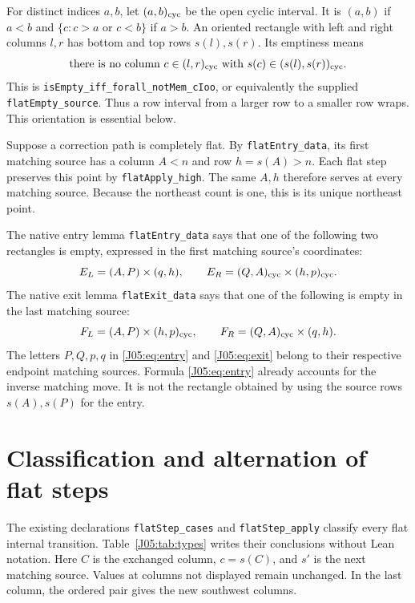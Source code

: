 \documentclass[11pt,oneside]{report}
\theoremstyle{definition}
\numberwithin{equation}{section}
\newcommand{\decl}[1]{\textnormal{\nolinkurl{#1}}}
\begin{document}
For distinct indices $a,b$, let $(a,b)_{\rm cyc}$ be the open cyclic interval.
It is $(a,b)$ if $a<b$ and
$\{c:c>a\text{ or }c<b\}$ if $a>b$. An oriented rectangle with left and right
columns $l,r$ has bottom and top rows $s(l),s(r)$. Its emptiness means
\begin{equation}\label{J05:eq:empty}
 \text{there is no column }c\in(l,r)_{\rm cyc}
 \text{ with }s(c)\in(s(l),s(r))_{\rm cyc}.
\end{equation}
This is \decl{isEmpty_iff_forall_notMem_cIoo}, or equivalently the supplied
\decl{flatEmpty_source}. Thus a row interval from a larger row to a smaller
row wraps. This orientation is essential below.

Suppose a correction path is completely flat. By \decl{flatEntry_data}, its
first matching source has a column $A<n$ and row $h=s(A)>n$. Each flat step
preserves this point by \decl{flatApply_high}. The same $A,h$ therefore serves
at every matching source. Because the northeast count is one, this is its
unique northeast point.

The native entry lemma \decl{flatEntry_data} says that one of the following
two rectangles is empty, expressed in the first matching source's coordinates:
\begin{equation}\label{J05:eq:entry}
 E_L=(A,P)\times(q,h),\qquad
 E_R=(Q,A)_{\rm cyc}\times(h,p)_{\rm cyc}.
\end{equation}
The native exit lemma \decl{flatExit_data} says that one of the following is
empty in the last matching source:
\begin{equation}\label{J05:eq:exit}
 F_L=(A,P)\times(h,p)_{\rm cyc},\qquad
 F_R=(Q,A)_{\rm cyc}\times(q,h).
\end{equation}
The letters $P,Q,p,q$ in \eqref{J05:eq:entry} and \eqref{J05:eq:exit} belong to their
respective endpoint matching sources. Formula \eqref{J05:eq:entry} already
accounts for the inverse matching move. It is not the rectangle obtained by
using the source rows $s(A),s(P)$ for the entry.

\section{Classification and alternation of flat steps}

The existing declarations \decl{flatStep_cases} and \decl{flatStep_apply}
classify every flat internal transition. Table~\ref{J05:tab:types} writes their
conclusions without Lean notation. Here $C$ is the exchanged column,
$c=s(C)$, and $s'$ is the next matching source. Values at columns not displayed
remain unchanged. In the last column, the ordered pair gives the new southwest
columns.
\end{document}

